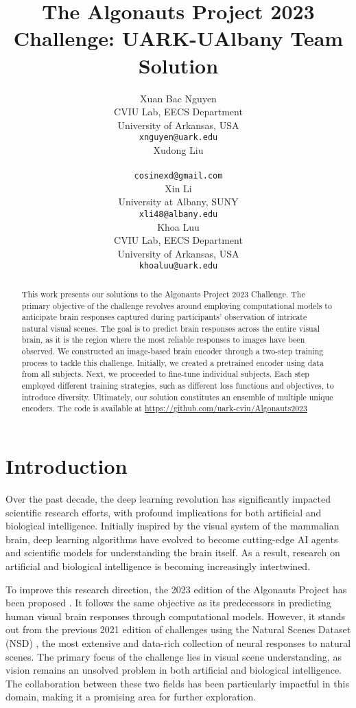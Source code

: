 \documentclass{article}
\title{The Algonauts Project 2023 Challenge: UARK-UAlbany Team Solution}
\date{} 					%
\author{Xuan Bac Nguyen\\
	CVIU Lab, EECS Department\\
	University of Arkansas, USA\\
	\texttt{xnguyen@uark.edu} \\
        \And
	{Xudong Liu} \\
 \\
	\texttt{cosinexd@gmail.com} \\
	\And
	{Xin Li} \\
	University at Albany, SUNY \\
	\texttt{xli48@albany.edu} \\
        \And
	{Khoa Luu} \\
	CVIU Lab, EECS Department\\
	University of Arkansas, USA\\
	\texttt{khoaluu@uark.edu} \\
}
\date{}
\begin{document}
\maketitle

\begin{abstract}
This work presents our solutions to the Algonauts Project 2023 Challenge. The primary objective of the challenge revolves around employing computational models to anticipate brain responses captured during participants' observation of intricate natural visual scenes. The goal is to predict brain responses across the entire visual brain, as it is the region where the most reliable responses to images have been observed. We constructed an image-based brain encoder through a two-step training process to tackle this challenge. Initially, we created a pretrained encoder using data from all subjects. Next, we proceeded to fine-tune individual subjects. Each step employed different training strategies, such as different loss functions and objectives, to introduce diversity. Ultimately, our solution constitutes an ensemble of multiple unique encoders. The code is available at \url{https://github.com/uark-cviu/Algonauts2023}
\end{abstract}





\section{Introduction}
Over the past decade, the deep learning revolution has significantly impacted scientific research efforts, with profound implications for both artificial and biological intelligence. Initially inspired by the visual system of the mammalian brain, deep learning algorithms have evolved to become cutting-edge AI agents and scientific models for understanding the brain itself. As a result, research on artificial and biological intelligence is becoming increasingly intertwined. 

To improve this research direction, the 2023 edition of the Algonauts Project has been proposed \cite{gifford2023algonauts}. It follows the same objective as its predecessors in predicting human visual brain responses through computational models. However, it stands out from the previous 2021 edition of challenges \cite{cichy2021algonauts} using the Natural Scenes Dataset (NSD) \cite{allen2022massive}, the most extensive and data-rich collection of neural responses to natural scenes. The primary focus of the challenge lies in visual scene understanding, as vision remains an unsolved problem in both artificial and biological intelligence. The collaboration between these two fields has been particularly impactful in this domain, making it a promising area for further exploration.
\end{document}
